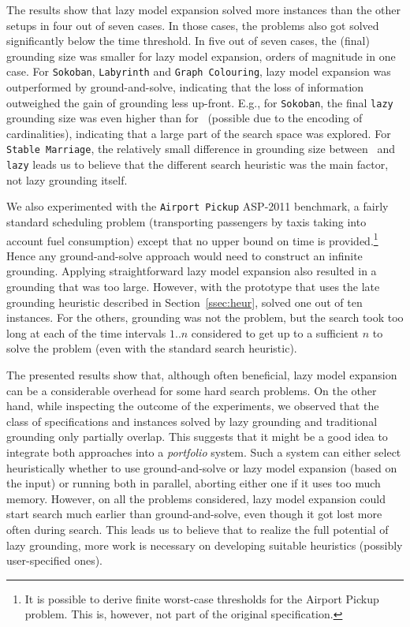 \documentclass[11pt]{article}
\newcommand{\logicname}[1]{\text{\sc #1}\xspace}
\newcommand{\idp}{\logicname{IDP}}
\theoremstyle{plain}
\theoremstyle{definition}
\theoremstyle{example_basic}
\theoremstyle{example_contd}
\theoremstyle{plain}
\newcommand{\stablemarriage}	{\texttt{Stable Marriage}\xspace}
\newcommand{\colouring}			{\texttt{Graph Colouring}\xspace}
\newcommand{\sokoban}			{\texttt{Sokoban}\xspace}
\newcommand{\labyrinth}			{\texttt{Labyrinth}\xspace}
\newcommand{\airportpickup}		{\texttt{Airport Pickup}\xspace}
\newcommand{\change}[1]{#1}
\begin{document}
The results show that lazy model expansion solved more instances than the other setups in four out of seven cases. In those cases, the problems also got solved significantly below the time threshold. In five out of seven cases, the (final) grounding size was smaller for lazy model expansion, orders of magnitude in one case. 
For \sokoban, \labyrinth and \colouring, lazy model expansion was outperformed by ground-and-solve, indicating that the loss of information outweighed the gain of grounding less up-front. E.g., for \sokoban, the  final \texttt{lazy} grounding size was even higher than for \gs\ (possible due to the \FO encoding of cardinalities), indicating that a large part of the search space was explored.
For \stablemarriage, the relatively small difference in grounding size between \gs\ and \texttt{lazy} leads us to believe that the different search heuristic was the main factor, not lazy grounding itself.

We also experimented with the \airportpickup ASP-2011 benchmark, a
fairly standard scheduling problem (transporting passengers by taxis
taking into account fuel consumption) except that no upper bound on
time is provided.\footnote{\change{It is possible to derive finite
    worst-case thresholds for the Airport Pickup problem. This is,
    however, not part of the original specification.}} Hence any
ground-and-solve approach would need to construct an infinite
grounding. Applying straightforward lazy model expansion also resulted
in a grounding that was too large. \change{However, with the prototype that uses the late grounding heuristic described in
  Section~\ref{ssec:heur},}
\idp solved one out of ten instances. For the others, grounding was not the problem, but the search took too long at each of the time intervals $1..n$ considered to get up to a sufficient $n$ to solve the problem (even with the standard search heuristic).

The presented results show that, although often beneficial, lazy model expansion can be a considerable overhead for some hard search problems. \change{On the other hand, while inspecting the outcome of the experiments, we observed that the class of specifications and instances solved by lazy grounding and traditional grounding only partially overlap. This suggests that it might be a good idea to integrate both approaches into a \emph{portfolio} system. Such a system can either select heuristically whether to use ground-and-solve or lazy model expansion (based on the input) or running both in parallel, aborting either one if it uses too much memory}. However, on all the problems considered, lazy model expansion could start search much earlier than ground-and-solve, even though it got lost more often during search. This leads us to believe that  to realize the  full potential of lazy grounding, more work is necessary on developing suitable heuristics (possibly user-specified ones).
\end{document}
